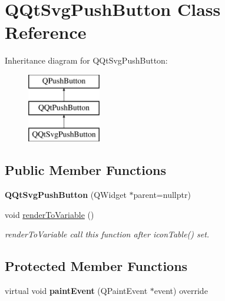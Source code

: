 \hypertarget{class_q_qt_svg_push_button}{}\section{Q\+Qt\+Svg\+Push\+Button Class Reference}
\label{class_q_qt_svg_push_button}
Inheritance diagram for Q\+Qt\+Svg\+Push\+Button\+:\begin{figure}[H]
\begin{center}
\leavevmode
\includegraphics[height=3.000000cm]{class_q_qt_svg_push_button}
\end{center}
\end{figure}
\subsection*{Public Member Functions}
\begin{DoxyCompactItemize}
\item 
\mbox{\label{class_q_qt_svg_push_button_a1b8bd4386cbba7be1ca9899d52827e10}} 
{\bfseries Q\+Qt\+Svg\+Push\+Button} (Q\+Widget $\ast$parent=nullptr)
\item 
\mbox{\label{class_q_qt_svg_push_button_a1e21832c977ac59853008e228b60540e}} 
void \mbox{\hyperlink{class_q_qt_svg_push_button_a1e21832c977ac59853008e228b60540e}{render\+To\+Variable}} ()
\begin{DoxyCompactList}\small\item\em render\+To\+Variable call this function after icon\+Table() set. \end{DoxyCompactList}\end{DoxyCompactItemize}
\subsection*{Protected Member Functions}
\begin{DoxyCompactItemize}
\item 
\mbox{\label{class_q_qt_svg_push_button_ade87b8145e0c0ba30967b73fa897931a}} 
virtual void {\bfseries paint\+Event} (Q\+Paint\+Event $\ast$event) override
\end{DoxyCompactItemize}
